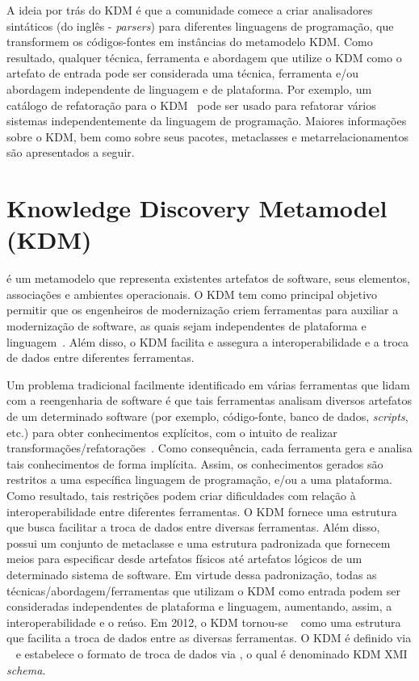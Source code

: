 A ideia por trás do KDM é que a comunidade comece a criar analisadores sintáticos (do inglês - \textit{parsers}) para diferentes linguagens de programação, que transformem os códigos-fontes em instâncias do metamodelo KDM. Como resultado, qualquer técnica, ferramenta e abordagem que utilize o KDM como o artefato de entrada pode ser considerada uma técnica, ferramenta e/ou abordagem independente de linguagem e de plataforma. Por exemplo, um catálogo de refatoração para o KDM~\cite{durelli_catalogo, durelli_VEM_ferramenta} pode ser usado para refatorar vários sistemas independentemente da linguagem de programação. Maiores informações sobre o KDM, bem como sobre seus pacotes, metaclasses e metarrelacionamentos são apresentados a seguir.

\section{Knowledge Discovery Metamodel (KDM)}
\label{sec:knowledge_discovery_meta_model}

 é um metamodelo que representa existentes artefatos de software, seus elementos, associações e ambientes operacionais. O KDM tem como principal objetivo permitir que os engenheiros de modernização criem ferramentas para auxiliar a modernização de software, as quais sejam independentes de plataforma e linguagem~\cite{KDM:specification, PerezCastillo:2011jo, ADMCHAPTERR}. Além disso, o KDM facilita e assegura a interoperabilidade e a troca de dados entre diferentes ferramentas. 

Um problema tradicional facilmente identificado em várias ferramentas que lidam com a reengenharia de software é que tais ferramentas analisam diversos artefatos de um determinado software (por exemplo, código-fonte, banco de dados, \textit{scripts}, etc.) para obter conhecimentos explícitos, com o intuito de realizar transformações/refatorações~\cite{rosenberg, Canfora2011}. Como consequência, cada ferramenta gera e analisa tais conhecimentos de forma implícita. Assim, os conhecimentos gerados são restritos a uma específica linguagem de programação, e/ou a uma plataforma. Como resultado, tais restrições podem criar dificuldades com relação à interoperabilidade entre diferentes ferramentas. O KDM fornece uma estrutura que busca facilitar a troca de dados entre diversas ferramentas. Além disso, possui um conjunto de metaclasse e uma estrutura padronizada que fornecem meios para especificar desde artefatos físicos até artefatos lógicos de um determinado sistema de software. Em virtude dessa padronização, todas as técnicas/abordagem/ferramentas que utilizam o KDM como entrada podem ser consideradas independentes de plataforma e linguagem, aumentando, assim, a interoperabilidade e o reúso. Em 2012, o KDM tornou-se ~\cite{KDM:ISO} como uma estrutura que facilita a troca de dados entre as diversas ferramentas. O KDM é definido via ~\cite{MOF} e estabelece o formato de troca de dados via , o qual é denominado KDM XMI \emph{schema}.

